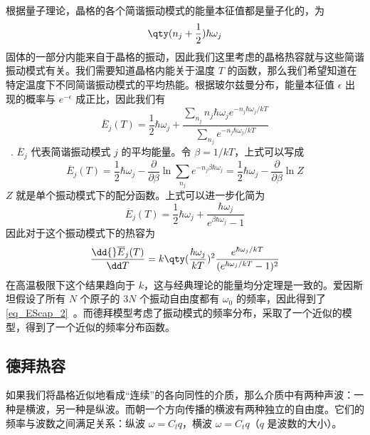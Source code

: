 

根据量子理论，晶格的各个简谐振动模式的能量本征值都是量子化的，为
\begin{equation}
\qty(n_j+\frac{1}{2})\hbar \omega_j
\end{equation}
固体的一部分内能来自于晶格的振动，因此我们这里考虑的晶格热容就与这些简谐振动模式有关。我们需要知道晶格内能关于温度 $T$ 的函数，那么我们希望知道在特定温度下不同简谐振动模式的平均热能。根据玻尔兹曼分布，能量本征值 $\epsilon$ 出现的概率与 $e^{-\epsilon}$ 成正比，因此我们有
\begin{equation}
\overline E_j(T)=\frac{1}{2}\hbar \omega_j + \frac{\sum_{n_j} n_j\hbar \omega_j e^{-n_j \hbar \omega_j / kT}}{\sum_{n_j} e^{-n_j \hbar \omega_j / kT}}
\end{equation}~.
$\overline E_j$ 代表简谐振动模式 $j$ 的平均能量。令 $\beta=1/kT$，上式可以写成
\begin{equation}
\overline E_j(T)=\frac{1}{2}\hbar \omega_j - \frac{\partial}{\partial \beta} \ln \sum_{n_j} e^{-n_j\beta\hbar\omega_j}=\frac{1}{2}\hbar \omega_j - \frac{\partial}{\partial \beta} \ln Z
\end{equation}
$Z$ 就是单个振动模式下的配分函数。上式可以进一步化简为
\begin{equation}
\overline E_j(T)=\frac{1}{2}\hbar \omega_j + \frac{\hbar \omega_j}{e^{\beta\hbar\omega_j}-1}
\end{equation}
因此对于这个振动模式下的热容为
\begin{equation}
\frac{\dd{} \overline E_j(T)}{\dd T}=k \qty(\frac{\hbar\omega_j}{kT})^2\frac{e^{\hbar \omega_j/kT}}{(e^{\hbar\omega_j/kT}-1)^2}
\end{equation}
在高温极限下这个结果趋向于 $k$，这与经典理论的能量均分定理是一致的。爱因斯坦假设了所有 $N$ 个原子的 $3N$ 个振动自由度都有 $\omega_0$ 的频率，因此得到了\autoref{eq_EScap_2}~。而德拜模型考虑了振动模式的频率分布，采取了一个近似的模型，得到了一个近似的频率分布函数。

\subsection{德拜热容}
如果我们将晶格近似地看成“连续”的各向同性的介质，那么介质中有两种声波：一种是横波，另一种是纵波。而朝一个方向传播的横波有两种独立的自由度。它们的频率与波数之间满足关系：纵波 $\omega=C_l q$，横波 $\omega=C_t q$（$q$ 是波数的大小）。

